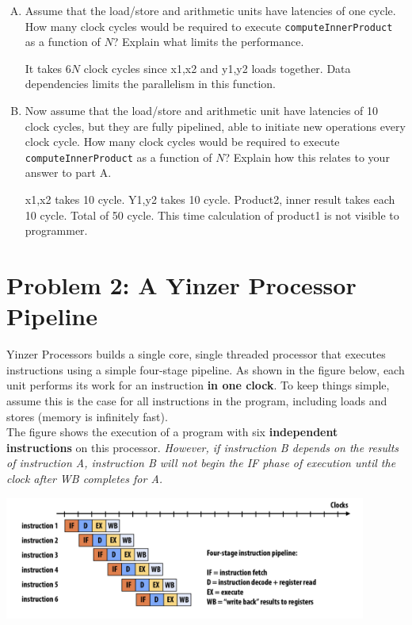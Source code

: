 \documentclass[11pt]{article}
\newenvironment{choice}{\begin{enumerate}[A.]}{\end{enumerate}}
\newenvironment{answer}{\begin{minipage}[c][1.5in]{\textwidth}}{\end{minipage}}
\begin{document}
\begin{choice}
\item  
Assume that the load/store and arithmetic units have latencies of one cycle.
How many clock cycles would be required to
execute \texttt{computeInnerProduct} as a function of $N$?    Explain what limits the performance.

\begin{answer}
  It takes $6N$ clock cycles since x1,x2 and y1,y2 loads together. Data dependencies limits the parallelism in this function.
\end{answer}
\item
Now assume that the load/store and arithmetic unit have
latencies of 10 clock cycles, but they are fully pipelined, able to
initiate new operations every clock cycle.  
How many clock cycles would be required to
execute \texttt{computeInnerProduct} as a function of $N$?    Explain how this relates to your answer to part A.

\begin{answer}
x1,x2 takes 10 cycle. Y1,y2 takes 10 cycle. Product2, inner result takes each 10 cycle. Total of 50 cycle. This time calculation of product1 is not visible to programmer.
\end{answer}
\end{choice}

\newpage

\section*{Problem 2: A Yinzer Processor Pipeline}

Yinzer Processors builds a single core, single threaded processor that executes instructions using a simple four-stage pipeline. As shown in the figure below, each unit performs its work for an instruction \textbf{in one clock}. To keep things simple, assume this is the case for all instructions in the program, including loads and stores (memory is infinitely fast).\\
The figure shows the execution of a program with six \textbf{independent instructions} on this processor. \textit{However, if instruction B depends on the results of instruction A, instruction B will not begin the IF phase of execution until the clock after WB completes for A.}

\begin{center}
    \includegraphics[width = 450px]{yinzer.png}\\
\end{center}
\end{document}
